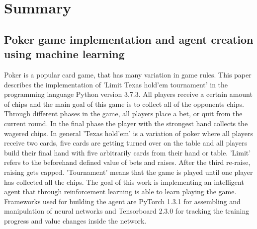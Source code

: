 \section*{Summary}
\subsection*{Poker game implementation and agent creation using machine learning}

Poker is a popular card game, that has many variation in game rules. This paper describes the implementation of 'Limit Texas hold'em tournament' in the programming language Python version 3.7.3. All players receive a certain amount of chips and the main goal of this game is to collect all of the opponents chips. Through different phases in the game, all players place a bet, or quit from the current round. In the final phase the player with the strongest hand collects the wagered chips. In general 'Texas hold'em' is a variation of poker where all players receive two cards, five cards are getting turned over on the table and all players build their final hand with five arbitrarily cards from their hand or table. 'Limit' refers to the beforehand defined value of bets and raises. After the third re-raise, raising gets capped. 'Tournament' means that the game is played until one player has collected all the chips. The goal of this work is implementing an intelligent agent that through reinforcement learning is able to learn playing the game. Frameworks used for building the agent are PyTorch 1.3.1 for assembling and manipulation of neural networks and Tensorboard 2.3.0 for tracking the training progress and value changes inside the network.